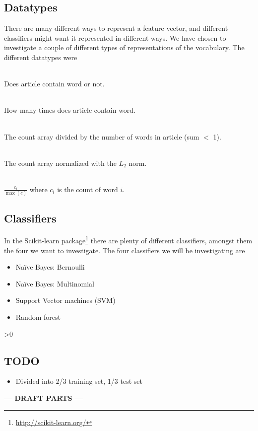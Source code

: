 \subsection{Datatypes}
There are many different ways to represent a feature vector, and different classifiers might want it represented in different ways. We have chosen to investigate a couple of different types of representations of the vocabulary. The different datatypes were
\begin{description}
\item[Binary:]\ \\Does article contain word or not.
\item[Count:]\ \\How many times does article contain word.
\item[Normalized Count by article length:]\ \\ The count array divided by the number of words in article (sum $<$ 1).
\item[$L_2$-normalized:]\ \\ The count array normalized with the $L_2$ norm. 
\item[Mapped value from 0 to 1:]\ \\ $\frac{c_i}{\max(c)}$ where $c_i$ is the count of word $i$.
\end{description}

\subsection{Classifiers}
In the Scikit-learn package\footnote{\url{http://scikit-learn.org/}} there are plenty of different classifiers, amongst them the four we want to investigate. The four classifiers we will be investigating are
\begin{itemize}[noitemsep,nolistsep]
\item Naïve Bayes: Bernoulli
\item Naïve Bayes: Multinomial
\item Support Vector machines (SVM)
\item Random forest 
\end{itemize}

\ifnum\printdraft>0
\subsection{TODO}
\begin{itemize}
\item Divided into 2/3 training set, 1/3 test set
\end{itemize}
\else
\begin{center}
\textbf{--- DRAFT PARTS ---}
\end{center}
\fi
